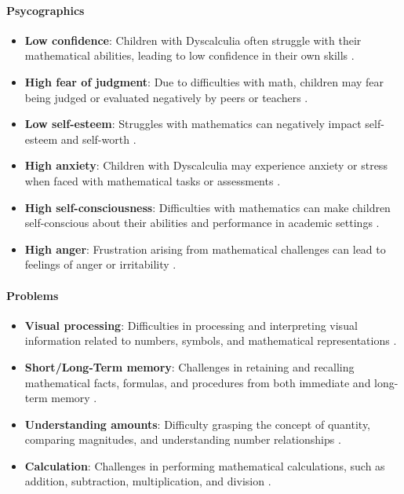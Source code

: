 \paragraph{Psycographics}
\begin{itemize}
    \item \textbf{Low confidence}: Children with Dyscalculia often struggle with their mathematical abilities, leading to low confidence in their own skills \cite{understood2024}.
    \item \textbf{High fear of judgment}: Due to difficulties with math, children may fear being judged or evaluated negatively by peers or teachers \cite{understood2024}.
    \item \textbf{Low self-esteem}: Struggles with mathematics can negatively impact self-esteem and self-worth \cite{clevelandclinic2024}.
    \item \textbf{High anxiety}: Children with Dyscalculia may experience anxiety or stress when faced with mathematical tasks or assessments \cite{pmc2024}.
    \item \textbf{High self-consciousness}: Difficulties with mathematics can make children self-conscious about their abilities and performance in academic settings \cite{understood2024}.
    \item \textbf{High anger}: Frustration arising from mathematical challenges can lead to feelings of anger or irritability \cite{understood2024}.
\end{itemize}

\paragraph{Problems}
\begin{itemize}
    \item \textbf{Visual processing}: Difficulties in processing and interpreting visual information related to numbers, symbols, and mathematical representations \cite{clevelandclinic2024}.
    \item \textbf{Short/Long-Term memory}: Challenges in retaining and recalling mathematical facts, formulas, and procedures from both immediate and long-term memory \cite{understood2024}.
    \item \textbf{Understanding amounts}: Difficulty grasping the concept of quantity, comparing magnitudes, and understanding number relationships \cite{pmc2024}.
    \item \textbf{Calculation}: Challenges in performing mathematical calculations, such as addition, subtraction, multiplication, and division \cite{understood2024}.
\end{itemize}

